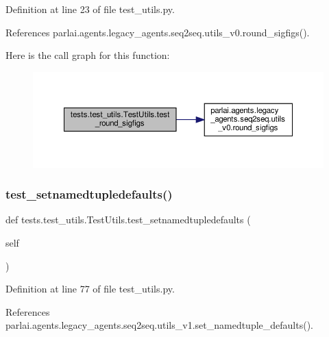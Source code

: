 Definition at line 23 of file test\+\_\+utils.\+py.



References parlai.\+agents.\+legacy\+\_\+agents.\+seq2seq.\+utils\+\_\+v0.\+round\+\_\+sigfigs().

Here is the call graph for this function\+:
\nopagebreak
\begin{figure}[H]
\begin{center}
\leavevmode
\includegraphics[width=350pt]{classtests_1_1test__utils_1_1TestUtils_aa020fc67900c834a020730f29cacc916_cgraph}
\end{center}
\end{figure}
\mbox{\label{classtests_1_1test__utils_1_1TestUtils_a211bff449c261cce734e51e3a937d1af}} 
\subsubsection{\texorpdfstring{test\+\_\+setnamedtupledefaults()}{test\_setnamedtupledefaults()}}
{\footnotesize\ttfamily def tests.\+test\+\_\+utils.\+Test\+Utils.\+test\+\_\+setnamedtupledefaults (\begin{DoxyParamCaption}\item[{}]{self }\end{DoxyParamCaption})}



Definition at line 77 of file test\+\_\+utils.\+py.



References parlai.\+agents.\+legacy\+\_\+agents.\+seq2seq.\+utils\+\_\+v1.\+set\+\_\+namedtuple\+\_\+defaults().

